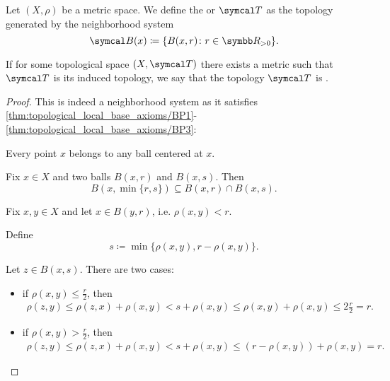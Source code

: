 \begin{definition}\label{def:metric_topology}\cite[249]{Engelking1989}
  Let \( (X, \rho) \) be a metric space. We define the  or  \( \Cal{T} \) as the topology generated by the neighborhood system
  \begin{equation*}
    \Cal{B}(x) \coloneqq \{ B(x, r) \colon r \in \R_{>0} \}.
  \end{equation*}

  If for some topological space \( (X, \Cal{T}) \) there exists a metric such that \( \Cal{T} \) is its induced topology, we say that the topology \( \Cal{T} \) is .
\end{definition}
\begin{proof}
  This is indeed a neighborhood system as it satisfies \ref{thm:topological_local_base_axioms/BP1}-\ref{thm:topological_local_base_axioms/BP3}:

  \begin{description}
     Every point \( x \) belongs to any ball centered at \( x \).

     Fix \( x \in X \) and two balls \( B(x, r) \) and \( B(x, s) \). Then
    \begin{equation*}
      B(x, \min\{ r, s \}) \subseteq B(x, r) \cap B(x, s).
    \end{equation*}

     Fix \( x, y \in X \) and let \( x \in B(y, r) \), i.e. \( \rho(x, y) < r \).

    Define
    \begin{equation*}
      s \coloneqq \min\{ \rho(x, y), r - \rho(x, y) \}.
    \end{equation*}

    Let \( z \in B(x, s) \). There are two cases:
    \begin{itemize}
      \item if \( \rho(x, y) \leq \tfrac r 2 \), then
      \begin{align*}
        \rho(z, y)
        \leq
        \rho(z, x) + \rho(x, y)
        <
        s + \rho(x, y)
        \leq
        \rho(x, y) + \rho(x, y)
        \leq
        2 \tfrac r 2
        =
        r.
      \end{align*}

      \item if \( \rho(x, y) > \tfrac r 2 \), then
      \begin{align*}
        \rho(z, y)
        \leq
        \rho(z, x) + \rho(x, y)
        <
        s + \rho(x, y)
        \leq
        (r - \rho(x, y)) + \rho(x, y)
        =
        r.
      \end{align*}
    \end{itemize}


\end{description}
\end{proof}

